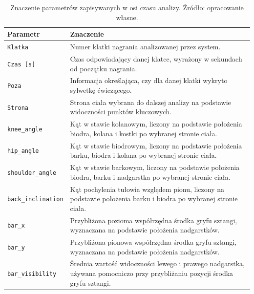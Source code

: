 \begin{table}[H]
\centering
\caption{Znaczenie parametrów zapisywanych w osi czasu analizy. Źródło: opracowanie własne.}
\label{tab:znaczenie-parametrow-osi-czasu}
\vspace{0.3cm}
\small
\begin{tabular}{p{4cm}p{10cm}}
\toprule
\textbf{Parametr} & \textbf{Znaczenie} \\
\midrule
\texttt{Klatka} & Numer klatki nagrania analizowanej przez system. \\

\texttt{Czas [s]} & Czas odpowiadający danej klatce, wyrażony w sekundach od początku nagrania. \\

\texttt{Poza} & Informacja określająca, czy dla danej klatki wykryto sylwetkę ćwiczącego. \\

\texttt{Strona} & Strona ciała wybrana do dalszej analizy na podstawie widoczności punktów kluczowych. \\

\texttt{knee\_angle} & Kąt w stawie kolanowym, liczony na podstawie położenia biodra, kolana i kostki po wybranej stronie ciała. \\

\texttt{hip\_angle} & Kąt w stawie biodrowym, liczony na podstawie położenia barku, biodra i kolana po wybranej stronie ciała. \\

\texttt{shoulder\_angle} & Kąt w stawie barkowym, liczony na podstawie położenia biodra, barku i nadgarstka po wybranej stronie ciała. \\

\texttt{back\_inclination} & Kąt pochylenia tułowia względem pionu, liczony na podstawie położenia barku i biodra po wybranej stronie ciała. \\

\texttt{bar\_x} & Przybliżona pozioma współrzędna środka gryfu sztangi, wyznaczana na podstawie położenia nadgarstków. \\

\texttt{bar\_y} & Przybliżona pionowa współrzędna środka gryfu sztangi, wyznaczana na podstawie położenia nadgarstków. \\

\texttt{bar\_visibility} & Średnia wartość widoczności lewego i prawego nadgarstka, używana pomocniczo przy przybliżaniu pozycji środka gryfu sztangi. \\
\bottomrule
\end{tabular}
\end{table}


